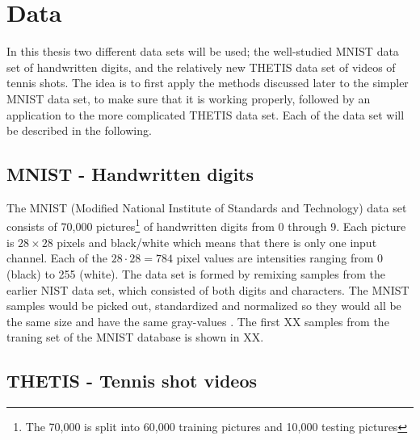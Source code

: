 \section{Data}

In this thesis two different data sets will be used; the well-studied MNIST data set \cite{MNIST} of handwritten digits, and the relatively new THETIS data set \cite{Gourgari2013} of videos of tennis shots. The idea is to first apply the methods discussed later to the simpler MNIST data set, to make sure that it is working properly, followed by an application to the more complicated THETIS data set. Each of the data set will be described in the following. 

\subsection{MNIST - Handwritten digits}
The MNIST (Modified National Institute of Standards and Technology) data set \cite{MNIST} consists of 70,000 pictures\footnote{The 70,000 is split into 60,000 training pictures and 10,000 testing pictures} of handwritten digits from 0 through 9. Each picture is $28\times 28$ pixels and black/white which means that there is only one input channel. Each of the $28\cdot 28 = 784$ pixel values are intensities ranging from 0 (black) to 255 (white). The data set is formed by remixing samples from the earlier NIST data set, which consisted of both digits and characters. The MNIST samples would be picked out, standardized and normalized so they would all be the same size and have the same gray-values \cite{mnistdatabase}. The first XX samples from the traning set of the MNIST database is shown in XX. 

\subsection{THETIS - Tennis shot videos}
